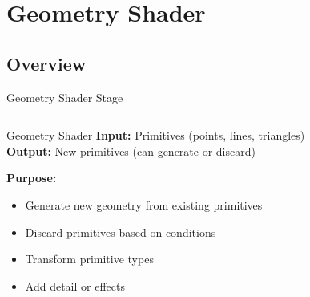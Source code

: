 \section{Geometry Shader}

\subsection{Overview}
\begin{frame}{Geometry Shader Stage}
  \begin{columns}
    \small
    \begin{column}{0.8\textwidth}
      \begin{raybox}{Geometry Shader}
        \textbf{Input:} Primitives (points, lines, triangles) \\
        \textbf{Output:} New primitives (can generate or discard)

        \vspace{0.3cm}
        \textbf{Purpose:}
        \begin{itemize}
          \item Generate new geometry from existing primitives
          \item Discard primitives based on conditions
          \item Transform primitive types
          \item Add detail or effects
        \end{itemize}
      \end{raybox}
    \end{column}
    \begin{column}{0.2\textwidth}
    \end{column}
  \end{columns}
\end{frame}


